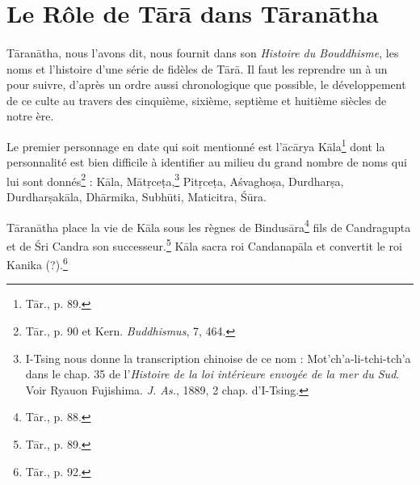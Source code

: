\documentclass[a4paper, 11pt, oneside, french, landscape, twocolumn]{article}
\begin{document}
\section{Le Rôle de T\={a}r\={a} dans T\={a}ran\={a}tha}
\paragraph{}
T\={a}ran\={a}tha, nous l'avons dit, nous fournit dans son \emph{Histoire du Bouddhisme}, les noms et l'histoire d'une série de fidèles de T\={a}r\={a}. Il faut les reprendre un à un pour suivre, d'après un ordre aussi chronologique que possible, le développement de ce culte au travers des cinquième, sixième, septième et huitième siècles de notre ère.

Le premier personnage en date qui soit mentionné est l'\={a}c\={a}rya K\={a}la\footnote{T\={a}r., p. 89.} dont la personnalité est bien difficile à identifier au milieu du grand nombre de noms qui lui sont donnés\footnote{T\={a}r., p. 90 et Kern. \emph{Buddhismus}, 7, 464.} : K\={a}la, M\={a}t\d{r}ce\d{t}a,\footnote{I-Tsing nous donne la transcription chinoise de ce nom : Mot'ch'a-li-tchi-tch'a dans le chap. 35 de l'\emph{Histoire de la loi intérieure envoyée de la mer du Sud}. Voir Ryauon Fujishima. \emph{J. As.}, 1889, 2 chap. d'I-Tsing.} Pit\d{r}ce\d{t}a, A\'{s}vagho\d{s}a, Durdhar\d{s}a, Durdhar\d{s}ak\={a}la, Dh\={a}rmika, Subh\={u}ti, Maticitra, \'{S}\={u}ra.

T\={a}ran\={a}tha place la vie de K\={a}la sous les règnes de Bindus\={a}ra\footnote{T\={a}r., p. 88.} fils de Candragupta et de \'{S}ri Candra son successeur.\footnote{T\={a}r., p. 89.} K\={a}la sacra roi Candanap\={a}la et convertit le roi Kanika (?).\footnote{T\={a}r., p. 92.}
\end{document}
